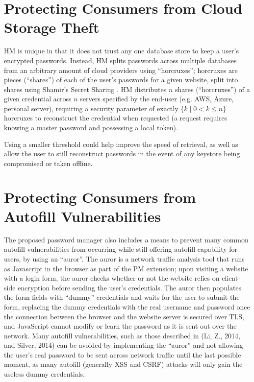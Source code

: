 \documentclass[conference]{IEEEtran}
\begin{document}
\section{Protecting Consumers from Cloud Storage Theft}
HM is unique in that it does not trust any one database store to keep a user's
encrypted passwords. Instead, HM splits passwords across multiple databases from
an arbitrary amount of cloud providers using ``horcruxes''; horcruxes are pieces
(``shares'') of each of the user's passwords for a given website, split into
shares using Shamir's Secret Sharing \cite{shamir1979share}. HM distributes $n$
shares (``horcruxes'') of a given credential across $n$ servers specified by the
end-user (e.g. AWS, Azure, personal server), requiring a security parameter of
exactly $\{k \mid 0 < k\leq n\}$ horcruxes to reconstruct the credential when
requested (a request requires knowing a master password and possessing a local
token). 

Using a smaller threshold could help improve the speed of retrieval, as well as
allow the user to still reconstruct passwords in the event of any keystore being
compromised or taken offline.

\section{Protecting Consumers from Autofill Vulnerabilities}
The proposed password manager also includes a means to prevent many common
autofill vulnerabilities from occurring while still offering autofill capability
for users, by using an ``auror''. The auror is a network traffic analysis tool
that runs as Javascript in the browser as part of the PM extension; upon
visiting a website with a login form, the auror checks whether or not the
website relies on client-side encryption before sending the user's credentials. 
The auror then populates the form fields with ``dummy''
credentials and waits for the user to submit the form, replacing the
dummy credentials with the real username and password once the connection
between the browser and the website server is secured over TLS, and JavaScript
cannot modify or learn the password as it is sent out over the network. Many
autofill vulnerabilities, such as those described in (Li, Z., 2014, and Silver,
2014) can be avoided by implementing the ``auror'' and not allowing the user's
real password to be sent across network traffic until the last possible moment,
as many autofill (generally XSS and CSRF) attacks will only gain the useless
dummy credentials.
\end{document}
